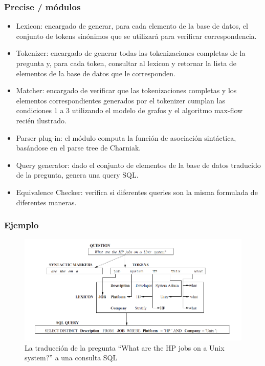 \fontsize{9.5pt}{7.2}\selectfont
\begin{frame}
\frametitle{Precise / módulos}

\begin{itemize}
  \item Lexicon: encargado de generar, para cada elemento de la base de datos, el conjunto de tokens sinónimos que se utilizará para verificar correspondencia.
  \item Tokenizer: encargado de generar todas las tokenizaciones completas de la pregunta y, para cada token, consultar al lexicon y retornar la lista de elementos de la base de datos que le corresponden.
  \item Matcher: encargado de verificar que las tokenizaciones completas y los elementos correspondientes generados por el tokenizer cumplan las condiciones 1 a 3 utilizando el modelo de grafos y el algoritmo max-flow recién ilustrado.
  \item Parser plug-in: el módulo computa la función de asociación sintáctica, basándose en el parse tree de Charniak.
  \item Query generator: dado el conjunto de elementos de la base de datos traducido de la pregunta, genera una query SQL.
  \item Equivalence Checker: verifica si diferentes queries son la misma formulada de diferentes maneras.
\end{itemize}
\end{frame}


\fontsize{11pt}{7.2}\selectfont
\begin{frame}
\frametitle{Ejemplo}
\begin{figure}
  \centering
    \includegraphics[scale=.7]{graficos/popescu-example}
  \caption{La traducción de la pregunta ``What are the HP jobs on a Unix system?'' a una consulta SQL}
  \label{fig:popescu-example}
\end{figure}

\end{frame}


